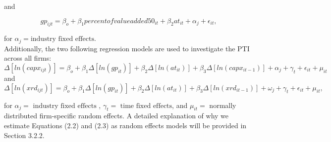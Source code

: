 \noindent and

\begin{equation}
	gp_{ijt} = \beta_{o} + \beta_{1}percentofvalueadded50_{it} + \beta_{2}at_{it} + \alpha_{j} + \epsilon_{it},
\end{equation}

\noindent for $\alpha_{j} = \text{industry fixed effects}$. \\

\noindent Additionally, the two following regression models are used to investigate the PTI across all firms:
\begin{equation}
	\Delta[ln(capx_{ijt})] = \beta_{o} + \beta_{1}\Delta[ln(gp_{it})] + \beta_{2}\Delta[ln(at_{it})] + \beta_{3}\Delta[ln(capx_{it - 1})] + \alpha_{j} + \gamma_{t} + \epsilon_{it} + \mu_{it}
\end{equation}
\noindent and
\begin{equation}
	\Delta[ln(xrd_{ijt})] = \beta_{o} + \beta_{1}\Delta[ln(gp_{it})] + \beta_{2}\Delta[ln(at_{it})] + \beta_{3}\Delta[ln(xrd_{it - 1})] + \omega_{j} + \gamma_{t} + \epsilon_{it} + \mu_{it},
\end{equation}

\noindent for $\alpha_{j} = \text{ industry fixed effects }$, $\gamma_{t} = \text{ time fixed effects}$, and $\mu_{it} = $ normally distributed firm-specific random effects. A detailed explanation of why we estimate Equations (2.2) and (2.3) as random effects models will be provided in Section 3.2.2.

